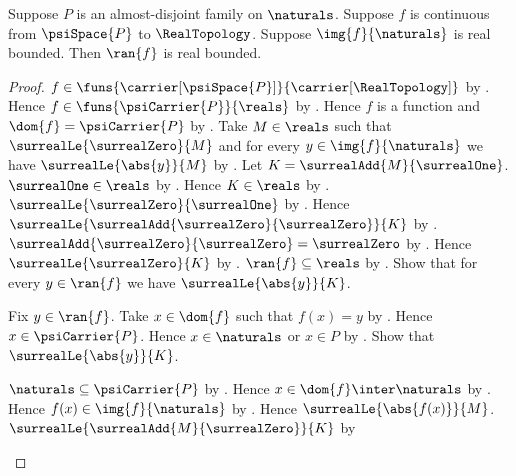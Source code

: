 \begin{lemma}\label{psi_continuous_real_map_bounded_if_naturals_bounded}
    Suppose $P$ is an almost-disjoint family on $\naturals$.
    Suppose $f$ is continuous from $\psiSpace{P}$ to $\RealTopology$.
    Suppose $\img{f}{\naturals}$ is real bounded.
    Then $\ran{f}$ is real bounded.
\end{lemma}
\begin{proof}
    $f\in\funs{\carrier[\psiSpace{P}]}{\carrier[\RealTopology]}$
        by .
    Hence $f\in\funs{\psiCarrier{P}}{\reals}$ by
        .
    Hence $f$ is a function and $\dom{f}=\psiCarrier{P}$ by
        .
    Take $M\in\reals$ such that $\surrealLe{\surrealZero}{M}$ and
        for every $y\in\img{f}{\naturals}$ we have
            $\surrealLe{\abs{y}}{M}$ by .
    Let $K=\surrealAdd{M}{\surrealOne}$.
    $\surrealOne\in\reals$ by .
    Hence $K\in\reals$ by .
    $\surrealLe{\surrealZero}{\surrealOne}$ by
        .
    Hence $\surrealLe{
        \surrealAdd{\surrealZero}{\surrealZero}}{K}$ by
        .
    $\surrealAdd{\surrealZero}{\surrealZero}=\surrealZero$ by
        .
    Hence $\surrealLe{\surrealZero}{K}$ by \auto.
    $\ran{f}\subseteq\reals$ by .
    Show that for every $y\in\ran{f}$ we have
        $\surrealLe{\abs{y}}{K}$.
    \begin{subproof}
        Fix $y\in\ran{f}$.
        Take $x\in\dom{f}$ such that $f(x)=y$ by .
        Hence $x\in\psiCarrier{P}$.
        Hence $x\in\naturals$ or $x\in P$
            by .
        Show that $\surrealLe{\abs{y}}{K}$.
        \begin{subproof}
            \begin{byCase}
                    $\naturals\subseteq\psiCarrier{P}$ by
                        .
                    Hence $x\in\dom{f}\inter\naturals$ by
                        .
                    Hence $f(x)\in\img{f}{\naturals}$ by
                        .
                    Hence $\surrealLe{\abs{f(x)}}{M}$.
                    $\surrealLe{\surrealAdd{M}{\surrealZero}}{K}$ by

\end{byCase}
\end{subproof}
\end{subproof}
\end{proof}
